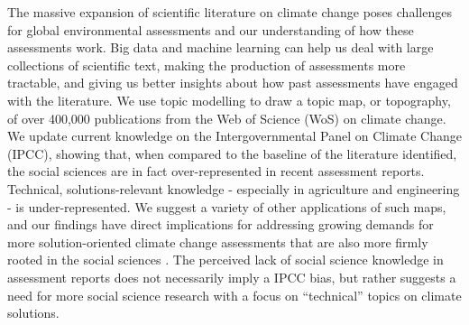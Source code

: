 \documentclass{article}
\begin{document}
	The massive expansion of scientific literature on climate change \cite{Minx2017l} poses challenges for global environmental assessments and our understanding of how these assessments work. 
	Big data and machine learning can help us deal with large collections of scientific text, making the production of assessments
	more tractable, and giving us better insights about how past assessments  have engaged with the literature.
	We use topic modelling to draw a topic map, or topography, of over 400,000 publications from the Web of Science (WoS) on climate change. 
	We update current knowledge on the Intergovernmental Panel on Climate Change (IPCC), showing that, when compared to the baseline of the literature identified,  the social sciences are in fact over-represented in recent assessment reports. Technical, solutions-relevant knowledge - especially in agriculture and engineering - is under-represented.
	We suggest a variety of other applications of such maps, and our findings have direct implications for addressing growing demands for more solution-oriented climate change assessments that are also more firmly rooted in the social sciences \cite{Kowarsch2017, Victor2015}.
	The perceived lack of social science knowledge in assessment reports does not necessarily imply a IPCC bias, but rather suggests a need for more social science research with a focus on ``technical'' topics on climate solutions. 
\end{document}
